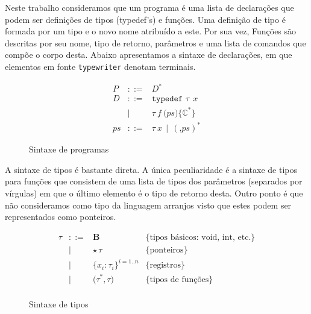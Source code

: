 \documentclass[a4paper,8pt]{article}
\begin{document}
     Neste trabalho consideramos que um programa é uma lista de
     declarações que podem ser definições de tipos (typedef's) e
     funções. Uma definição de tipo é formada por um tipo e o novo 
     nome atribuído a este. Por sua vez, Funções são descritas por seu 
     nome, tipo de retorno, parâmetros e uma lista de comandos que 
     compõe o corpo desta. Abaixo apresentamos a sintaxe de
     declarações, em que elementos em fonte \texttt{typewriter}
     denotam terminais.
     
     \begin{figure}[H]
         \[
               \begin{array}{lcl}
                   P & ::=    & D^*\\
                   D & ::=   & \texttt{typedef }\tau\:\:x\\
                      & \mid & \tau\:f\:\texttt{(}ps\texttt{)} \texttt{\{}\mathbb{C}^*\texttt{\}} \\
                   ps & ::= & \tau\:x \,\mid\,(\texttt{,}ps)^*
               \end{array}
         \]
         \centering
         \caption{Sintaxe de programas}
         \label{figprogsyn}
     \end{figure}

     A sintaxe de tipos é bastante direta. A única peculiaridade é a
     sintaxe de tipos para funções que consistem de uma lista de tipos
     dos parâmetros (separados por vírgulas) em que o último elemento
     é o tipo de retorno desta. Outro ponto é que não consideramos
     como tipo da linguagem arranjos visto que estes podem ser
     representados como ponteiros.

     \begin{figure}[H]
       \[
         \begin{array}{lcll}
           \tau & ::= & \textbf{B} & \{\text{tipos básicos: void, int,
                                     etc.}\}\\
                & \mid & \star\, \tau & \{\text{ponteiros}\} \\
                & \mid & \{x_i : \tau_i\}^{i=1..n} & \{\text{registros}\} \\
                & \mid & \texttt{(}\tau^*, \tau\texttt{)} & \{\text{tipos de funções}\}\\
         \end{array}
       \]
       \centering
       \caption{Sintaxe de tipos}
       \label{figtypesyn}
     \end{figure}
     
\end{document}
